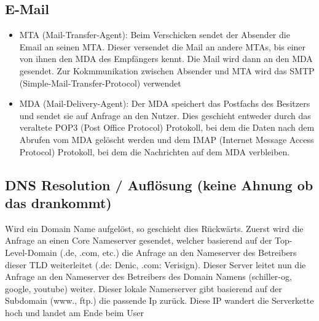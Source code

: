 \documentclass{article}
\begin{document}
\subsection*{E-Mail}
\begin{itemize}
    \item MTA (Mail-Transfer-Agent): Beim Verschicken sendet der Absender die Email an seinen MTA.
    Dieser versendet die Mail an andere MTAs, bis einer von ihnen den MDA des Empfängers kennt.
    Die Mail wird dann an den MDA gesendet. Zur Kokmmunikation zwischen Absender und MTA wird das
    SMTP (Simple-Mail-Transfer-Protocol) verwendet
    \item MDA (Mail-Delivery-Agent): Der MDA speichert das Postfachs des Besitzers und sendet sie auf 
    Anfrage an den Nutzer. Dies geschieht entweder durch das veraltete POP3 (Post Office Protocol) Protokoll,
    bei dem die Daten nach dem Abrufen vom MDA gelöscht werden und dem IMAP (Internet Message Access Protocol) Protokoll,
    bei dem die Nachrichten auf dem MDA verbleiben.
\end{itemize}

\subsection*{DNS Resolution / Auflösung (keine Ahnung ob das drankommt)}
Wird ein Domain Name aufgelöst, so geschieht dies Rückwärts. Zuerst wird die Anfrage an einen Core Nameserver gesendet, welcher
basierend auf der Top-Level-Domain (.de, .com, etc.) die Anfrage an den Nameserver des Betreibers dieser TLD weiterleitet
(.de: Denic, .com: Verisign). Dieser Server leitet nun die Anfrage an den Nameserver des Betreibers des Domain Namens
(schiller-og, google, youtube) weiter. Dieser lokale Namerserver gibt basierend auf der Subdomain (www., ftp.) die passende
Ip zurück. Diese IP wandert die Serverkette hoch und landet am Ende beim User
\end{document}
